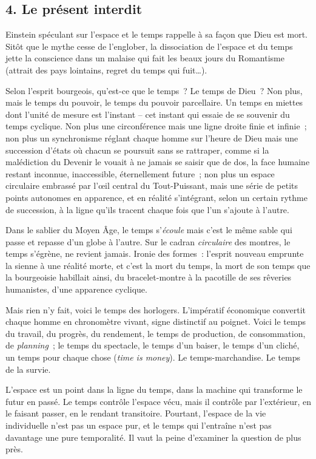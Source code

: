 \documentclass[french,twoside]{book} %
\begin{document}
\subsection[{4. Le présent interdit}]{\textsc{4.} Le présent interdit}
\noindent Einstein spéculant sur l’espace et le temps rappelle à sa façon que Dieu est mort. Sitôt que le mythe cesse de l’englober, la dissociation de l’espace et du temps jette la conscience dans un malaise qui fait les beaux jours du Romantisme (attrait des pays lointains, regret du temps qui fuit…).\par
Selon l’esprit bourgeois, qu’est-ce que le temps ? Le temps de Dieu ? Non plus, mais le temps du pouvoir, le temps du pouvoir parcellaire. Un temps en miettes dont l’unité de mesure est l’instant – cet instant qui essaie de se souvenir du temps cyclique. Non plus une circonférence mais une ligne droite finie et infinie ; non plus un synchronisme réglant chaque homme sur l’heure de Dieu mais une succession d’états où chacun se poursuit sans se rattraper, comme si la malédiction du Devenir le vouait à ne jamais se saisir que de dos, la face humaine restant inconnue, inaccessible, éternellement future ; non plus un espace circulaire embrassé par l’œil central du Tout-Puissant, mais une série de petits points autonomes en apparence, et en réalité s’intégrant, selon un certain rythme de succession, à la ligne qu’ils tracent chaque fois que l’un s’ajoute à l’autre.\par
Dans le sablier du Moyen Âge, le temps s’\emph{écoule} mais c’est le même sable qui passe et repasse d’un globe à l’autre. Sur le cadran \emph{circulaire} des montres, le temps s’égrène, ne revient jamais. Ironie des formes : l’esprit nouveau emprunte la sienne à une réalité morte, et c’est la mort du temps, la mort de son temps que la bourgeoisie habillait ainsi, du bracelet-montre à la pacotille de ses rêveries humanistes, d’une apparence cyclique.\par
Mais rien n’y fait, voici le temps des horlogers. L’impératif économique convertit chaque homme en chronomètre vivant, signe distinctif au poignet. Voici le temps du travail, du progrès, du rendement, le temps de production, de consommation, de \emph{planning} ; le temps du spectacle, le temps d’un baiser, le temps d’un cliché, un temps pour chaque chose (\emph{time is money}). Le temps-marchandise. Le temps de la survie.\par
L’espace est un point dans la ligne du temps, dans la machine qui transforme le futur en passé. Le temps contrôle l’espace vécu, mais il contrôle par l’extérieur, en le faisant passer, en le rendant transitoire. Pourtant, l’espace de la vie individuelle n’est pas un espace pur, et le temps qui l’entraîne n’est pas davantage une pure temporalité. Il vaut la peine d’examiner la question de plus près.\par
\end{document}
